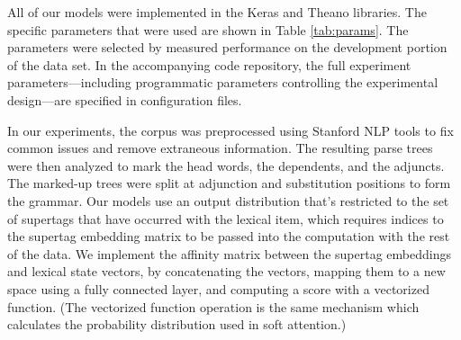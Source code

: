 \documentclass[11pt]{article}
\begin{document}
All of our models were implemented in the Keras
\cite{chollet2015keras} and Theano \cite{theano} libraries.  The
specific parameters that were used are shown in Table
\ref{tab:params}.  The parameters were selected by measured
performance on the development portion of the data set.  In the
accompanying code repository, the full experiment
parameters---including programmatic parameters controlling the
experimental design---are specified in configuration files.
 
In our experiments, the corpus was preprocessed using Stanford NLP tools \cite{de2006generating} to fix common issues and remove extraneous information.  The
resulting parse trees were then analyzed to mark the head words, the
dependents, and the adjuncts.  The marked-up trees were split at
adjunction and substitution positions to form the grammar.  Our models
use an output distribution that's restricted to the set of supertags
that have occurred with the lexical item, which requires indices to
the supertag embedding matrix to be passed into the computation with
the rest of the data.  We implement the affinity matrix between the
supertag embeddings and lexical state vectors, by concatenating the
vectors, mapping them to a new space using a fully connected layer,
and computing a score with a vectorized function.
%
(The vectorized function operation is the same mechanism which
calculates the probability distribution used in soft attention.)
 

\newpage


\end{document}
